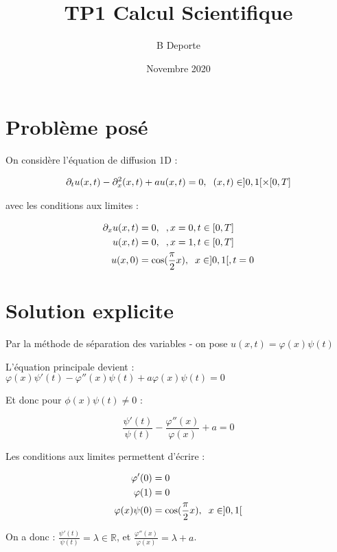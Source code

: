 \documentclass[french]{article}
\title{TP1 Calcul Scientifique}
\author{B Deporte}
\date{Novembre 2020}
\begin{document}
\maketitle

\section{Problème posé}

On considère l'équation de diffusion 1D :

\begin{align}
\partial_{t}u(x,t)-\partial_{x}^{2}(x,t)+au(x,t)=0,\hspace{2mm}(x,t)\in]0,1[\times[0,T]
\end{align}

avec les conditions aux limites :

\begin{align}
\partial_{x}u(x,t)&=0, \hspace{2mm}, x=0, t\in[0,T] \\
u(x,t)&=0, \hspace{2mm}, x=1, t\in[0,T] \\
u(x,0)&=\mathrm{cos}(\frac{\pi}{2}x), \hspace{2mm} x\in]0,1[, t=0
\end{align}

\section{Solution explicite}

Par la méthode de séparation des variables - on pose $ u(x,t)=\varphi(x)\psi(t) $

L'équation principale devient : $ \varphi(x)\psi'(t)-\varphi''(x)\psi(t)+a\varphi(x)\psi(t)=0 $

Et donc pour $ \phi(x)\psi(t) \neq 0 $ :

\[
\frac{\psi'(t)}{\psi(t)}-\frac{\varphi''(x)}{\varphi(x)}+a=0
\]

Les conditions aux limites permettent d'écrire :

\begin{align}
\varphi'(0)&=0 \\
\varphi(1)&=0 \\
\varphi(x)\psi(0)&=\mathrm{cos}(\frac{\pi}{2}x), \hspace{2mm} x\in]0,1[
\end{align}

On a donc : $ \frac{\psi'(t)}{\psi(t)}=\lambda \in \mathbb{R} $, et $ \frac{\varphi''(x)}{\varphi(x)}=\lambda+a $.
\end{document}
